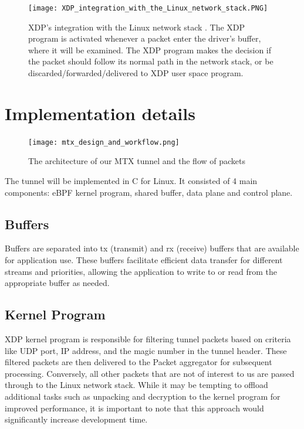 \begin{figure}[H]
	\centering
	\texttt{[image: XDP\_integration\_with\_the\_Linux\_network\_stack.PNG]}
	\caption{XDP’s integration with the Linux network stack \cite{hoiland_jorgensen_express_2018}. The XDP program is activated whenever a packet enter the driver's buffer, where it will be examined. The XDP program makes the decision if the packet should follow its normal path in the network stack, or be discarded/forwarded/delivered to XDP user space program.}\label{fig:approach_design:xdp_architecture}
\end{figure}


\section{Implementation details}

\begin{figure}[H]
	\centering
	\texttt{[image: mtx\_design\_and\_workflow.png]}
	\caption{The architecture of our MTX tunnel and the flow of packets}
	\label{fig:approach_design:mtx_design_and_workflow}
\end{figure}

The tunnel will be implemented in C for Linux. It consisted of 4 main components: eBPF kernel program, shared buffer, data plane and control plane.

\subsection{Buffers}
Buffers are separated into tx (transmit) and rx (receive) buffers that are available for application use. 
These buffers facilitate efficient data transfer for different streams and priorities, allowing the application to write to or read from the appropriate buffer as needed.

\subsection{Kernel Program}
XDP kernel program is responsible for filtering tunnel packets based on criteria like UDP port, IP address, and the magic number in the tunnel header. 
These filtered packets are then delivered to the Packet aggregator for subsequent processing. 
Conversely, all other packets that are not of interest to us are passed through to the Linux network stack.
While it may be tempting to offload additional tasks such as unpacking and decryption to the kernel program for improved performance, it is important to note that this approach would significantly increase development time.

